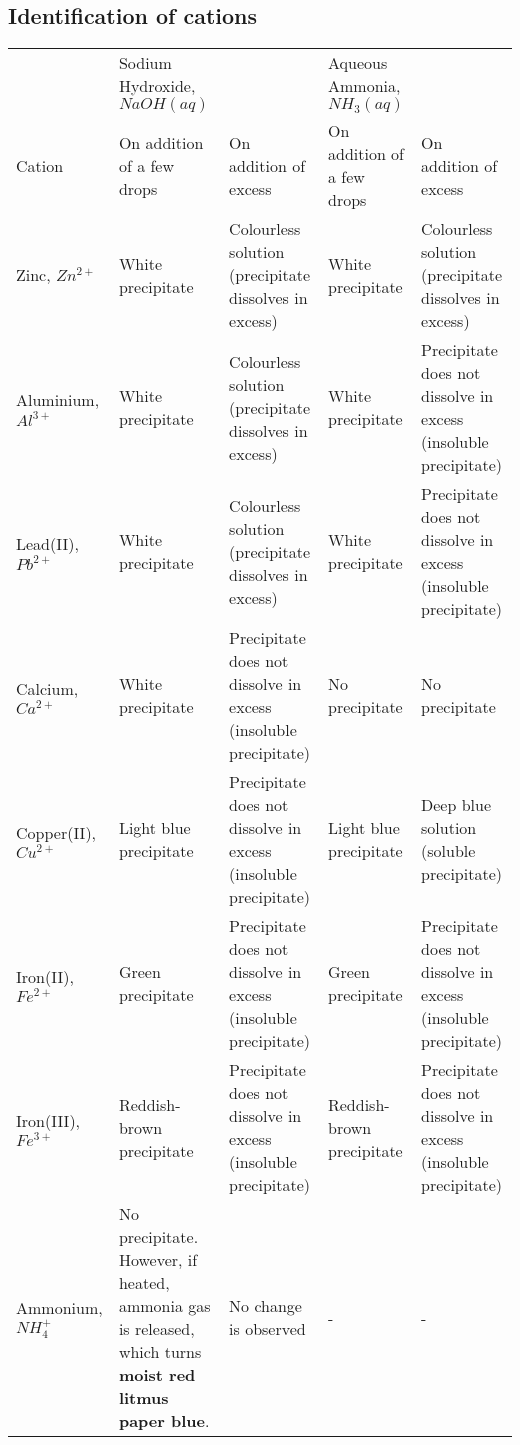 \documentclass[11pt]{article}
\begin{document}
\subsection{Identification of cations}
\label{sec:org6b5cb5f}
\begin{center}
\begin{tabular}{lllll}
 & Sodium Hydroxide, \(NaOH (aq)\) &  & Aqueous Ammonia, \(NH_3 (aq)\) & \\
Cation & On addition of a few drops & On addition of excess & On addition of a few drops & On addition of excess\\
\hline
Zinc, \(Zn^{2+}\) & White precipitate & Colourless solution (precipitate dissolves in excess) & White precipitate & Colourless solution (precipitate dissolves in excess)\\
Aluminium, \(Al^{3+}\) & White precipitate & Colourless solution (precipitate dissolves in excess) & White precipitate & Precipitate does not dissolve in excess (insoluble precipitate)\\
Lead(II), \(Pb^{2+}\) & White precipitate & Colourless solution (precipitate dissolves in excess) & White precipitate & Precipitate does not dissolve in excess (insoluble precipitate)\\
Calcium, \(Ca^{2+}\) & White precipitate & Precipitate does not dissolve in excess (insoluble precipitate) & No precipitate & No precipitate\\
Copper(II), \(Cu^{2+}\) & Light blue precipitate & Precipitate does not dissolve in excess (insoluble precipitate) & Light blue precipitate & Deep blue solution (soluble precipitate)\\
Iron(II), \(Fe^{2+}\) & Green precipitate & Precipitate does not dissolve in excess (insoluble precipitate) & Green precipitate & Precipitate does not dissolve in excess (insoluble precipitate)\\
Iron(III), \(Fe^{3+}\) & Reddish-brown precipitate & Precipitate does not dissolve in excess (insoluble precipitate) & Reddish-brown precipitate & Precipitate does not dissolve in excess (insoluble precipitate)\\
Ammonium, \(NH_4^+\) & No precipitate. However, if heated, ammonia gas is released, which turns \textbf{moist red litmus paper blue}. & No change is observed & - & -\\
\end{tabular}
\end{center}
\end{document}
